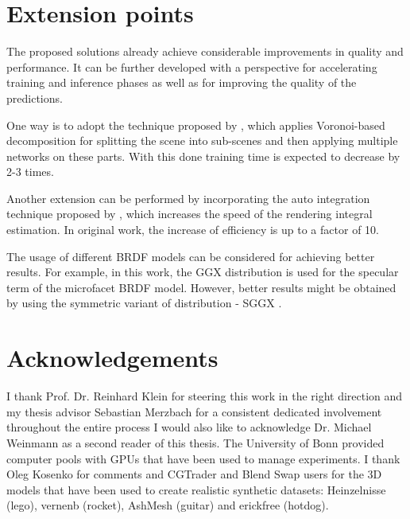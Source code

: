 

\section{Extension points}

The proposed solutions already achieve considerable improvements in quality and performance.
It can be further developed with a perspective for accelerating training and inference phases
as well as for improving the quality of the predictions.

One way is to adopt the technique proposed by \cite{rebain2020derf},
which applies Voronoi-based decomposition for splitting the scene into sub-scenes
and then applying multiple networks on these parts.
With this done training time is expected to decrease by 2-3 times.

Another extension can be performed by incorporating the auto integration technique proposed by \cite{lindell2021autoint},
which increases the speed of the rendering integral estimation.
In original work, the increase of efficiency is up to a factor of 10.

The usage of different BRDF models can be considered for achieving better results.
For example, in this work, the GGX distribution \cite{walter2007microfacet}
is used for the specular term of the microfacet BRDF model.
However, better results might be obtained by using the symmetric variant of distribution - SGGX \cite{heitz2015sggx}.




\section{Acknowledgements}


I thank Prof. Dr. Reinhard Klein for steering this work in the right direction and my thesis advisor Sebastian Merzbach for a consistent dedicated involvement throughout the entire process
I would also like to acknowledge Dr. Michael Weinmann as a second reader of this thesis.
The University of Bonn provided computer pools with GPUs that have been used to manage experiments.
I thank Oleg Kosenko for comments
and CGTrader and Blend Swap users for the 3D models
that have been used to create realistic synthetic datasets:
Heinzelnisse (lego), vernenb (rocket), AshMesh (guitar) and erickfree (hotdog).

